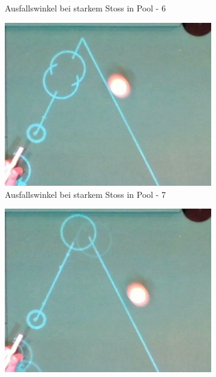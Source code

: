 \begin{figure}[h!]
\begin{subfigure}[b]{0.2\textwidth}
        \caption{Ausfallswinkel bei starkem Stoss in Pool - 6}
        \label{fig:rebound_angle_fast_pool_6}
    \end{subfigure}
    \hfill
    \begin{subfigure}[b]{0.2\textwidth}
        \centering
        \includegraphics[width=1.0\linewidth]{../common/04_results/resources/simulation/rebound_angle_fast_pool/00_rail_rebound_angle_fast_pool_07.png}
        \caption{Ausfallswinkel bei starkem Stoss in Pool - 7}
        \label{fig:rebound_angle_fast_pool_7}
    \end{subfigure}
    \hfill
    \begin{subfigure}[b]{0.2\textwidth}
        \centering
        \includegraphics[width=1.0\linewidth]{../common/04_results/resources/simulation/rebound_angle_fast_pool/00_rail_rebound_angle_fast_pool_08.png}

\end{subfigure}
\end{figure}
